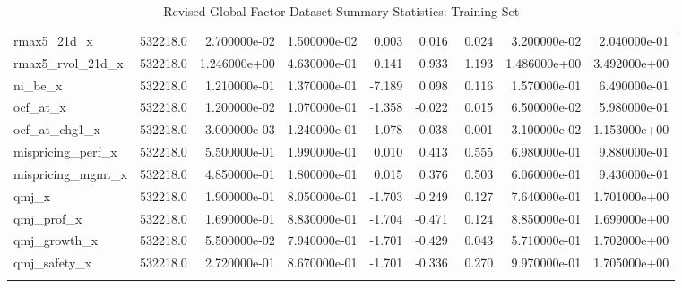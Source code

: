 \documentclass[12pt]{article}
\begin{document}
\begin{landscape}
\begin{longtable}{|l|r|r|r|r|r|r|r|r|}
		rmax5\_21d\_x            & 532218.0 & 2.700000e-02  & 1.500000e-02 & 0.003      & 0.016       & 0.024       & 3.200000e-02  & 2.040000e-01 \\
		rmax5\_rvol\_21d\_x      & 532218.0 & 1.246000e+00  & 4.630000e-01 & 0.141      & 0.933       & 1.193       & 1.486000e+00  & 3.492000e+00 \\
		ni\_be\_x                & 532218.0 & 1.210000e-01  & 1.370000e-01 & -7.189     & 0.098       & 0.116       & 1.570000e-01  & 6.490000e-01 \\
		ocf\_at\_x               & 532218.0 & 1.200000e-02  & 1.070000e-01 & -1.358     & -0.022      & 0.015       & 6.500000e-02  & 5.980000e-01 \\
		ocf\_at\_chg1\_x         & 532218.0 & -3.000000e-03 & 1.240000e-01 & -1.078     & -0.038      & -0.001      & 3.100000e-02  & 1.153000e+00 \\
		mispricing\_perf\_x      & 532218.0 & 5.500000e-01  & 1.990000e-01 & 0.010      & 0.413       & 0.555       & 6.980000e-01  & 9.880000e-01 \\
		mispricing\_mgmt\_x      & 532218.0 & 4.850000e-01  & 1.800000e-01 & 0.015      & 0.376       & 0.503       & 6.060000e-01  & 9.430000e-01 \\
		qmj\_x                   & 532218.0 & 1.900000e-01  & 8.050000e-01 & -1.703     & -0.249      & 0.127       & 7.640000e-01  & 1.701000e+00 \\
		qmj\_prof\_x             & 532218.0 & 1.690000e-01  & 8.830000e-01 & -1.704     & -0.471      & 0.124       & 8.850000e-01  & 1.699000e+00 \\
		qmj\_growth\_x           & 532218.0 & 5.500000e-02  & 7.940000e-01 & -1.701     & -0.429      & 0.043       & 5.710000e-01  & 1.702000e+00 \\
		qmj\_safety\_x           & 532218.0 & 2.720000e-01  & 8.670000e-01 & -1.701     & -0.336      & 0.270       & 9.970000e-01  & 1.705000e+00 \\
		\bottomrule
		\caption{Revised Global Factor Dataset Summary Statistics: Training Set}
		\label{table:ss-train}
	\end{longtable}

	\newpage


\end{landscape}
\end{document}
